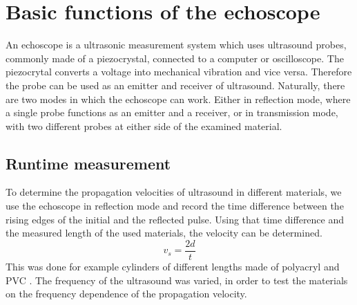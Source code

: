 \documentclass[a4paper,10pt,twocolumn]{article}
\begin{document}
    
    
    \section{Basic functions of the echoscope}\label{sec:BasicFunctions}
    An echoscope is a ultrasonic measurement system which uses ultrasound probes, commonly made of a piezocrystal, connected to a computer or oscilloscope.
    The piezocrytal converts a voltage into mechanical vibration and vice versa.
    Therefore the probe can be used as an emitter and receiver of ultrasound.
    Naturally, there are two modes in which the echoscope can work.
    Either in reflection mode, where a single probe functions as an emitter and a receiver, or in transmission mode, with two different probes at either side of the examined material.
    
    \subsection{Runtime measurement}\label{subsec:RuntimeMeasurement}
    To determine the propagation velocities of ultrasound in different materials, we use the echoscope in reflection mode and record the time difference between the 
    rising edges of the initial and the reflected pulse.
    Using that time difference and the measured length of the used materials, the velocity can be determined.
    \begin{equation}
        v_s = \frac{2d}{t}
    \end{equation}
    This was done for example cylinders of different lengths made of polyacryl and PVC .
    The frequency of the ultrasound was varied, in order to test the materials on the frequency dependence of the propagation velocity.
\end{document}
